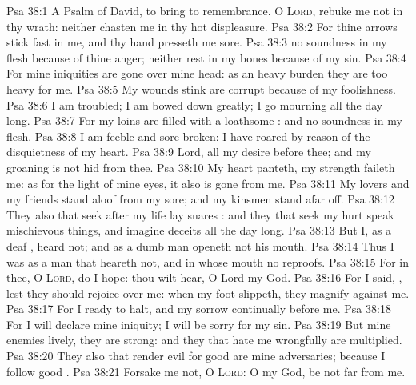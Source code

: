 \vs Psa 38:1 A Psalm of David, to bring to remembrance. O \textsc{Lord}, rebuke me not in thy wrath: neither chasten me in thy hot displeasure.
\vs Psa 38:2 For thine arrows stick fast in me, and thy hand presseth me sore.
\vs Psa 38:3  no soundness in my flesh because of thine anger; neither  rest in my bones because of my sin.
\vs Psa 38:4 For mine iniquities are gone over mine head: as an heavy burden they are too heavy for me.
\vs Psa 38:5 My wounds stink  are corrupt because of my foolishness.
\vs Psa 38:6 I am troubled; I am bowed down greatly; I go mourning all the day long.
\vs Psa 38:7 For my loins are filled with a loathsome : and  no soundness in my flesh.
\vs Psa 38:8 I am feeble and sore broken: I have roared by reason of the disquietness of my heart.
\vs Psa 38:9 Lord, all my desire  before thee; and my groaning is not hid from thee.
\vs Psa 38:10 My heart panteth, my strength faileth me: as for the light of mine eyes, it also is gone from me.
\vs Psa 38:11 My lovers and my friends stand aloof from my sore; and my kinsmen stand afar off.
\vs Psa 38:12 They also that seek after my life lay snares : and they that seek my hurt speak mischievous things, and imagine deceits all the day long.
\vs Psa 38:13 But I, as a deaf , heard not; and  as a dumb man  openeth not his mouth.
\vs Psa 38:14 Thus I was as a man that heareth not, and in whose mouth  no reproofs.
\vs Psa 38:15 For in thee, O \textsc{Lord}, do I hope: thou wilt hear, O Lord my God.
\vs Psa 38:16 For I said, , lest  they should rejoice over me: when my foot slippeth, they magnify  against me.
\vs Psa 38:17 For I  ready to halt, and my sorrow  continually before me.
\vs Psa 38:18 For I will declare mine iniquity; I will be sorry for my sin.
\vs Psa 38:19 But mine enemies  lively,  they are strong: and they that hate me wrongfully are multiplied.
\vs Psa 38:20 They also that render evil for good are mine adversaries; because I follow  good .
\vs Psa 38:21 Forsake me not, O \textsc{Lord}: O my God, be not far from me.
